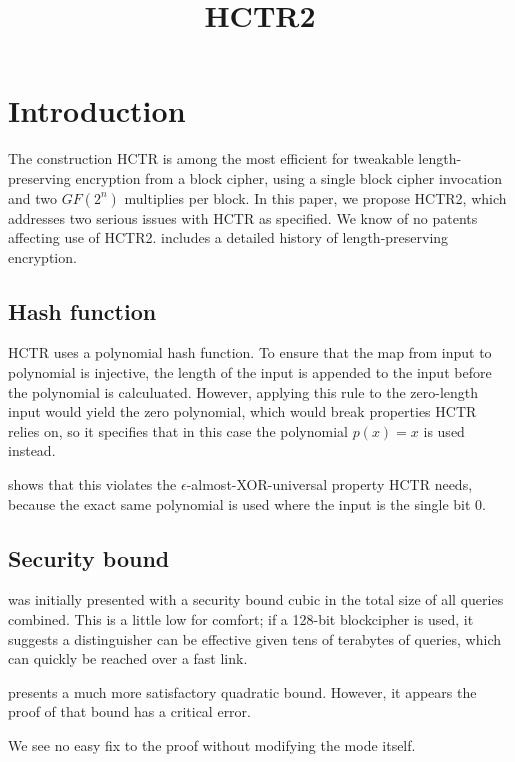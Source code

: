 \documentclass[letterpaper,11pt]{article}
\title{HCTR2}
\begin{document}
\maketitle

\begin{abstract}
\end{abstract}

\section{Introduction}
The construction HCTR\cite{hctr} is among the most efficient for 
tweakable length-preserving encryption from a block cipher, using
a single block cipher invocation and two \(GF(2^n)\) multiplies
per block. In this paper, we propose HCTR2, which addresses
two serious issues with HCTR as specified. We know of no
patents affecting use of HCTR2. \cite{adiantum} includes a detailed history of length-preserving encryption.

\subsection{Hash function}
HCTR uses a polynomial hash function. To ensure that the map from 
input to polynomial is injective, the length of the input is appended
to the input before the polynomial is calculuated. However, applying
this rule to the zero-length input would yield the zero polynomial,
which would break properties HCTR relies on, so it specifies that
in this case the polynomial \(p(x) = x\) is used instead.

\cite{kumarhctr} shows that this violates the 
\(\epsilon\)-almost-XOR-universal\cite{eadu} property HCTR needs, because
the exact same polynomial is used where the input is the single bit 0.

\subsection{Security bound}
\cite{hctr} was initially presented with a security bound cubic
in the total size of all queries combined.  This is a little low
for comfort; if a 128-bit blockcipher is used, it suggests a
distinguisher can be effective given tens of terabytes of queries,
which can quickly be reached over a fast link. 

\cite{hctrquad} presents a much more satisfactory quadratic bound.
However, it appears the proof of that bound has a critical error.

We see no easy fix to the proof
without modifying the mode itself.
\end{document}
